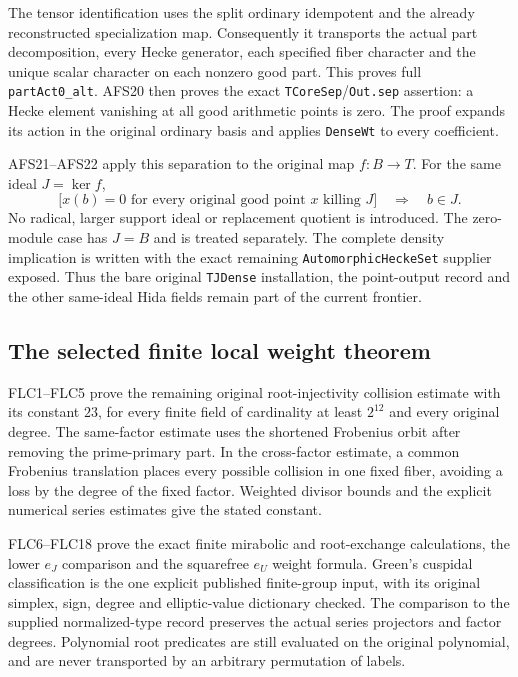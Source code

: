 The tensor identification uses the split ordinary idempotent and
the already reconstructed specialization map. Consequently it
transports the actual part decomposition, every Hecke generator,
each specified fiber character and the unique scalar character on
each nonzero good part. This proves full \texttt{part\allowbreak Act0\_\allowbreak alt}.
AFS20 then proves the exact \texttt{TCore\allowbreak Sep}/\texttt{Out.\allowbreak sep}
assertion: a Hecke element vanishing at all good arithmetic points
is zero. The proof expands its action in the original ordinary
basis and applies \texttt{Dense\allowbreak Wt} to every coefficient.

AFS21--AFS22 apply this separation to the original map $f:B\to T$.
For the same ideal $J=\ker f$,
\[
 \bigl[x(b)=0\text{ for every original good point }x
                  \text{ killing }J\bigr]\quad\Longrightarrow\quad b\in J.
\]
No radical, larger support ideal or replacement quotient is introduced.
The zero-module case has $J=B$ and is treated separately. The complete
density implication is written with the exact remaining
\texttt{Automorphic\allowbreak Hecke\allowbreak Set} supplier exposed. Thus the bare original
\texttt{TJDense} installation, the point-output record and the other
same-ideal Hida fields remain part of the current frontier.

\subsection{The selected finite local weight theorem}

FLC1--FLC5 prove the remaining original root-injectivity collision
estimate with its constant $23$, for every finite field of cardinality
at least $2^{12}$ and every original degree. The same-factor estimate
uses the shortened Frobenius orbit after removing the prime-primary
part. In the cross-factor estimate, a common Frobenius translation
places every possible collision in one fixed fiber, avoiding a loss
by the degree of the fixed factor. Weighted divisor bounds and the
explicit numerical series estimates give the stated constant.

FLC6--FLC18 prove the exact finite mirabolic and root-exchange
calculations, the lower $e_J$ comparison and the squarefree $e_U$
weight formula. Green's cuspidal classification is the one explicit
published finite-group input, with its original simplex, sign, degree
and elliptic-value dictionary checked. The comparison to the supplied
normalized-type record preserves the actual series projectors and
factor degrees. Polynomial root predicates are still evaluated on
the original polynomial, and are never transported by an arbitrary
permutation of labels.

